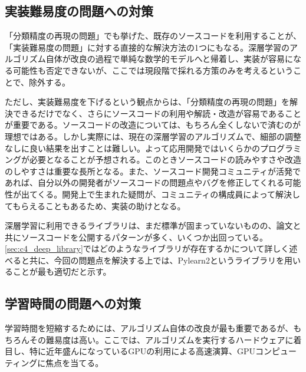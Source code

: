 \subsection{実装難易度の問題への対策}
\label{subsec:c4_provision_difficulty}
「分類精度の再現の問題」でも挙げた、既存のソースコードを利用することが、「実装難易度の問題」に対する直接的な解決方法の1つにもなる。深層学習のアルゴリズム自体が改良の過程で単純な数学的モデルへと帰着し、実装が容易になる可能性も否定できないが、ここでは現段階で採れる方策のみを考えるということで、除外する。\par
ただし、実装難易度を下げるという観点からは、「分類精度の再現の問題」を解決できるだけでなく、さらにソースコードの利用や解読・改造が容易であることが重要である。ソースコードの改造については、もちろん全くしないで済むのが理想ではある。しかし実際には、現在の深層学習のアルゴリズムで、細部の調整なしに良い結果を出すことは難しい。よって応用開発ではいくらかのプログラミングが必要となることが予想される。このときソースコードの読みやすさや改造のしやすさは重要な長所となる。また、ソースコード開発コミュニティが活発であれば、自分以外の開発者がソースコードの問題点やバグを修正してくれる可能性が出てくる。開発上で生まれた疑問が、コミュニティの構成員によって解決してもらえることもあるため、実装の助けとなる。\par%
深層学習に利用できるライブラリは、まだ標準が固まっていないものの、論文と共にソースコードを公開するパターンが多く、いくつか出回っている。\ref{sec:c4_deep_library}ではどのようなライブラリが存在するかについて詳しく述べると共に、今回の問題点を解決する上では、Pylearn2というライブラリを用いることが最も適切だと示す。


\subsection{学習時間の問題への対策}
\label{subsec:c4_provision_exectime}
学習時間を短縮するためには、アルゴリズム自体の改良が最も重要であるが、もちろんその難易度は高い。ここでは、アルゴリズムを実行するハードウェアに着目し、特に近年盛んになっているGPUの利用による高速演算、GPUコンピューティングに焦点を当てる。

